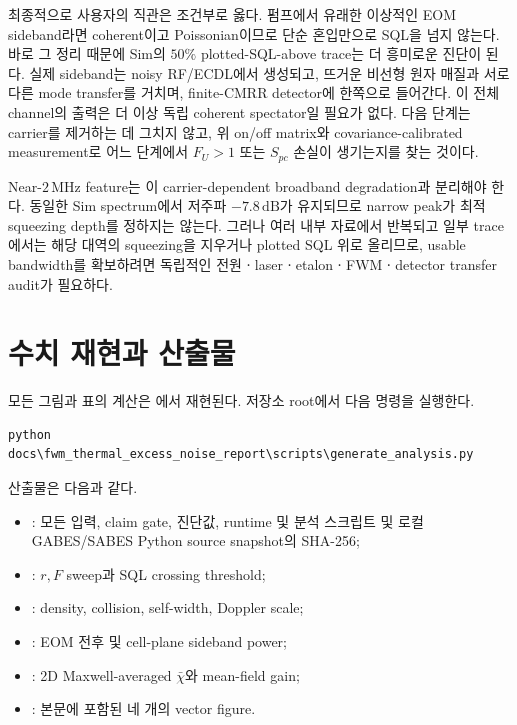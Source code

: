 \documentclass[11pt,a4paper]{article}
\newcommand{\MHz}{\,\mathrm{MHz}}
\newcommand{\dB}{\,\mathrm{dB}}
\begin{document}
최종적으로 사용자의 직관은 조건부로 옳다. 펌프에서 유래한 이상적인 EOM
sideband라면 coherent이고 Poissonian이므로 단순 혼입만으로 SQL을 넘지 않는다.
바로 그 정리 때문에 Sim의 $50\%$ plotted-SQL-above trace는 더 흥미로운 진단이 된다.
실제 sideband는 noisy RF/ECDL에서 생성되고, 뜨거운 비선형 원자 매질과 서로 다른
mode transfer를 거치며, finite-CMRR detector에 한쪽으로 들어간다. 이 전체 channel의
출력은 더 이상 독립 coherent spectator일 필요가 없다. 다음 단계는 carrier를
제거하는 데 그치지 않고, 위 on/off matrix와 covariance-calibrated measurement로
어느 단계에서 $F_U>1$ 또는 $S_{pc}$ 손실이 생기는지를 찾는 것이다.

Near-$2\MHz$ feature는 이 carrier-dependent broadband degradation과 분리해야 한다.
동일한 Sim spectrum에서 저주파 $-7.8\dB$가 유지되므로 narrow peak가 최적 squeezing
depth를 정하지는 않는다. 그러나 여러 내부 자료에서 반복되고 일부 trace에서는 해당
대역의 squeezing을 지우거나 plotted SQL 위로 올리므로, usable bandwidth를 확보하려면
독립적인 전원ㆍlaserㆍetalonㆍFWMㆍdetector transfer audit가 필요하다.

\appendix
\section{수치 재현과 산출물}

모든 그림과 표의 계산은 에서 재현된다. 저장소
root에서 다음 명령을 실행한다.
\begin{verbatim}
python docs\fwm_thermal_excess_noise_report\scripts\generate_analysis.py
\end{verbatim}
산출물은 다음과 같다.
\begin{itemize}
\item {}: 모든 입력, claim gate, 진단값, runtime 및
분석 스크립트 및 로컬 GABES/SABES Python source snapshot의 SHA-256;
\item {}: $r,F$ sweep과 SQL crossing threshold;
\item {}: density, collision, self-width, Doppler scale;
\item {}: EOM 전후 및 cell-plane sideband power;
\item {}: 2D Maxwell-averaged $\bar\chi$와 mean-field gain;
\item {}: 본문에 포함된 네 개의 vector figure.
\end{itemize}
\end{document}
